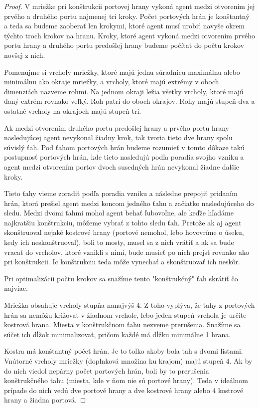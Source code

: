 \begin{proof}
V mriežke pri konštrukcii portovej hrany vykoná agent medzi otvorením jej
prvého a druhého portu najmenej tri kroky. Počet portových hrán je
konštantný a teda sa budeme zaoberať len krokymi, ktoré agent musí urobiť
navyše okrem týchto troch krokov na hranu. Kroky, ktoré agent vykoná medzi
otvorením prvého portu hrany a druhého portu predošlej hrany budeme počítať
do počtu krokov novšej z nich.

Pomenujme si vrcholy mriežky, ktoré majú jednu súradnicu maximálnu alebo
minimálnu ako okraje mriežky, a vrcholy, ktoré majú extrémy v oboch
dimenziách nazveme rohmi. Na jednom okraji ležia všetky vrcholy, ktoré majú
daný extrém rovnako veľký. Roh patrí do oboch okrajov.
Rohy majú stupeň dva a ostatné vrcholy na okrajoch majú stupeň tri.

Ak medzi otvorením druhého portu predošlej hrany a prvého portu hrany
nasledujúcej agent nevykonal žiadny krok, tak tvoria tieto dve hrany spolu
súvislý ťah. Pod ťahom portových hrán budeme rozumieť v tomto dôkaze takú
postupnosť portových hrán, kde tieto nasledujú podľa poradia svojho vzniku a
agent medzi otvorením portov dvoch susedných hrán nevykonal žiadne ďalšie
kroky.

Tieto ťahy vieme zoradiť podľa poradia vzniku a následne prepojiť pridaním
hrán, ktorá prešiel agent medzi koncom jedného ťahu a začiatko
nasledujúceho do sledu. Medzi dvomi ťahmi mohol agent behať ľubovoľne, ale
keďže hľadáme najkratšiu konštrukciu, môžeme vybrať z tohto sledu ťah.
Pretože ak aj agent skonštruoval nejaké kostrové hrany (portové nemohol,
lebo hovovríme o úseku, kedy ich neskonštruoval), boli to mosty, musel sa z
nich vrátiť a ak sa bude vracať do vrcholov, ktoré vznikli s nimi, bude
musieť po nich prejsť rovnako ako pri konštrukcii. Ic konštrukciu teda môže
vynechať a skonštruovať ich neskôr.

Pri optimalizácii počtu krokov sa snažíme tento "konštrukčný" ťah skrátiť čo
najviac.

Mriežka obsahuje vrcholy stupňa nanajvýš 4. Z toho vyplýva, že ťahy z
portových hrán sa nemôžu križovať v žiadnom vrchole, lebo jeden stupeň
vrchola je určite kostrová hrana. Miesta v konštrukčnom ťahu nezveme
prerušenia. Snažíme sa súčet ich dĺžok minimalizovať, pričom každé má dĺžku
minimálne 1 hrana.

Kostra má konštantný počet hrán. Je to toľko akoby bola ťah s dvomi listami.
Vnútorné vrcholy mriežky (doplnková množina ku krajom) majú stupeň 4. Ak by
do nich viedol nepárny počet portových hrán, boli by to prerušenia
konštrukčného ťahu (miesta, kde v ňom nie sú portové hrany). Teda v ideálnom
prípade do nich vedú dve portové hrany a dve kostrové hrany alebo 4 kostrové
hrany a žiadna portová.


\end{proof}
